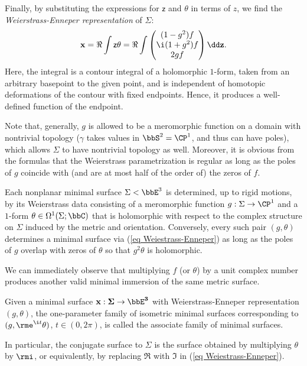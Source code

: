 Finally, by substituting the expressions for $\mathsf{z}$ and $\theta$ in terms of $z$, we find the \emph{Weierstrass-Enneper representation} of $\Sigma$:
\[\bf{x}=\Re\int \mathsf{z}\theta=\Re\int 
\begin{pmatrix}
    (1-g^2)f\\ \i (1+g^2)f\\ 2gf
\end{pmatrix}\dd z.\label{eq Weiestrass-Enneper}\]
Here, the integral is a contour integral of a holomorphic $1$-form, taken from an arbitrary basepoint to the given point, and is independent of homotopic deformations of the contour with fixed endpoints. Hence, it produces a well-defined function of the endpoint. 

Note that, generally, $g$ is allowed to be a meromorphic function on a domain with nontrivial topology ($\gamma$ takes values in $\bbS^2=\CP^1$, and thus can have poles), which allows $\Sigma$ to have nontrivial topology as well. Moreover, it is obvious from the formulas that the Weierstrass parametrization is regular as long as the poles of $g$ coincide with (and are at most half of the order of) the zeros of $f$.

\begin{cor}
    Each nonplanar minimal surface $\Sigma<\bbE^3$ is determined, up to rigid motions, by its Weierstrass data consisting of a meromorphic function $g:\Sigma\to \CP^1$ and a $1$-form $\theta\in\Omega^1(\Sigma;\bbC)$ that is holomorphic with respect to the complex structure on $\Sigma$ induced by the metric and orientation. Conversely, every such pair $(g,\theta)$ determines a minimal surface via (\ref{eq Weiestrass-Enneper}) as long as the poles of $g$ overlap with zeros of $\theta$ so that $g^2\theta$ is holomorphic.
\end{cor}

We can immediately observe that multiplying $f$ (or $\theta$) by a unit complex number produces another valid minimal immersion of the same metric surface.

\begin{defn}
    Given a minimal surface $\bf{x}:\Sigma\to \bbE^3$ with Weierstrass-Enneper representation $(g,\theta)$, the one-parameter family of isometric minimal surfaces corresponding to $(g,\rme^{\i t}\theta)$, $t\in (0,2\pi)$, is called the associate family of minimal surfaces.
    
    In particular, the conjugate surface to $\Sigma$ is the surface obtained by multiplying $\theta$ by $\rmi$, or equivalently, by replacing $\Re$ with $\Im$ in (\ref{eq Weiestrass-Enneper}).
\end{defn}

